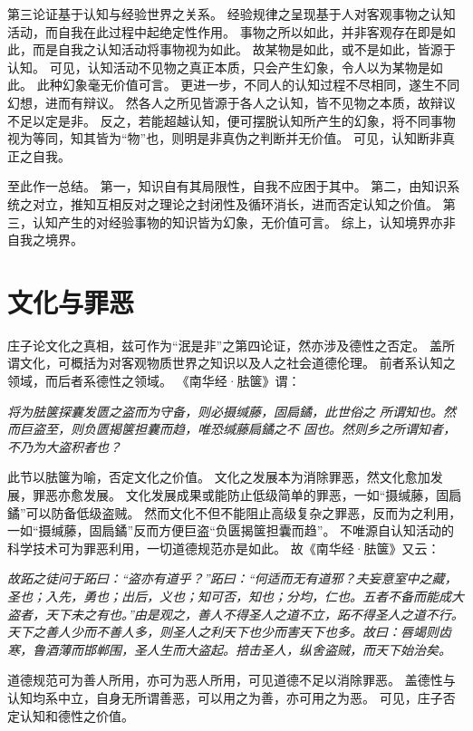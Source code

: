 \documentclass[11pt]{article}
\begin{document}
\par

第三论证基于认知与经验世界之关系。
经验规律之呈现基于人对客观事物之认知活动，而自我在此过程中起绝定性作用。
事物之所以如此，并非客观存在即是如此，而是自我之认知活动将事物视为如此。
故某物是如此，或不是如此，皆源于认知。
可见，认知活动不见物之真正本质，只会产生幻象，令人以为某物是如此。
此种幻象毫无价值可言。
更进一步，不同人的认知过程不尽相同，遂生不同幻想，进而有辩议。
然各人之所见皆源于各人之认知，皆不见物之本质，故辩议不足以定是非。
反之，若能超越认知，便可摆脱认知所产生的幻象，将不同事物视为等同，知其皆为“物”也，则明是非真伪之判断并无价值。
可见，认知断非真正之自我。

\par

至此作一总结。
第一，知识自有其局限性，自我不应困于其中。
第二，由知识系统之对立，推知互相反对之理论之封闭性及循环消长，进而否定认知之价值。
第三，认知产生的对经验事物的知识皆为幻象，无价值可言。
综上，认知境界亦非自我之境界。

\section{文化与罪恶}
庄子论文化之真相，兹可作为“泯是非”之第四论证，然亦涉及德性之否定。
盖所谓文化，可概括为对客观物质世界之知识以及人之社会道德伦理。
前者系认知之领域，而后者系德性之领域。
《南华经·胠箧》谓：

\textit{将为胠箧探囊发匮之盗而为守备，则必摄缄藤，固扃鐍，此世俗之 所谓知也。然而巨盗至，则负匮揭箧担囊而趋，唯恐缄藤扃鐍之不 固也。然则乡之所谓知者，不乃为大盗积者也？}

此节以胠箧为喻，否定文化之价值。
文化之发展本为消除罪恶，然文化愈加发展，罪恶亦愈发展。
文化发展成果或能防止低级简单的罪恶，一如“摄缄藤，固扃鐍”可以防备低级盗贼。
然而文化不但不能阻止高级复杂之罪恶，反而为之利用，一如“摄缄藤，固扃鐍”反而方便巨盗“负匮揭箧担囊而趋”。
不唯源自认知活动的科学技术可为罪恶利用，一切道德规范亦是如此。
故《南华经·胠箧》又云：

\textit{故跖之徒问于跖曰：“盗亦有道乎？”跖曰：“何适而无有道邪？夫妄意室中之藏，圣也；入先，勇也；出后，义也；知可否，知也；分均，仁也。五者不备而能成大盗者，天下未之有也。”由是观之，善人不得圣人之道不立，跖不得圣人之道不行。天下之善人少而不善人多，则圣人之利天下也少而害天下也多。故曰：唇竭则齿寒，鲁酒薄而邯郸围，圣人生而大盗起。掊击圣人，纵舍盗贼，而天下始治矣。}

道德规范可为善人所用，亦可为恶人所用，可见道德不足以消除罪恶。
盖德性与认知均系中立，自身无所谓善恶，可以用之为善，亦可用之为恶。
可见，庄子否定认知和德性之价值。
\end{document}
